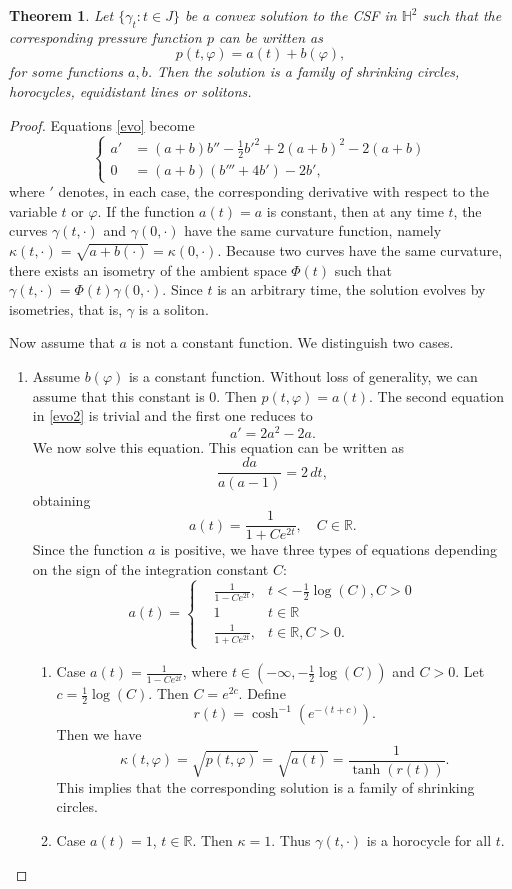 \documentclass[10pt,a4paper]{amsart}
\newtheorem{theorem}{Theorem}
\def\h{\mathbb H}
\def\r{\mathbb R}
\begin{document}
\begin{theorem}\label{t42}
Let $\{\gamma_t\colon t \in J\}$ be a convex solution to the CSF in $\h^2$ such that the corresponding pressure function $p$ can be written as 
$$p(t, \varphi) = a(t) + b(\varphi),$$
for some functions $a,b$. Then the solution   is a  family of shrinking circles, horocycles, equidistant lines or solitons.
\end{theorem}

\begin{proof}
Equations \eqref{evo} become
\begin{equation}\label{evo2}
\left\{
\begin{split}
a' &= (a+b)b'' - \frac{1}{2}b'^2 + 2(a+b)^2 - 2(a+b) \\
0&= (a+b)(b'''+4b')-2b',
\end{split}\right.
\end{equation}
where $'$ denotes, in each case, the corresponding derivative with respect to the variable $t$ or $\varphi$. 
 If the function $a(t)=a$ is constant, then at any time $t$, the curves $\gamma(t, \cdot)$ and $\gamma(0, \cdot)$ have the same curvature function, namely $\kappa(t, \cdot) = \sqrt{a + b(\cdot)} = \kappa(0, \cdot)$. 
Because two curves have the same curvature, there exists an isometry of the ambient space $\Phi(t)$ such that $\gamma(t, \cdot) = \Phi(t)\gamma(0, \cdot)$. Since $t$ is an arbitrary time, the solution evolves by isometries,  that is, $\gamma$ is a soliton.  
 
Now assume that $a$ is not a constant function. We distinguish two cases.
\begin{enumerate}
\item Assume   $b(\varphi) $ is a constant function. Without loss of generality, we can assume that this constant is $0$. Then $p(t, \varphi) = a(t)$.  The second equation in \eqref{evo2} is trivial and the first one   reduces to  
$$a' = 2a^2 - 2a.$$ 
We now solve this equation. This equation can be written as
$$\frac{da}{a(a-1)}=2\, dt,$$
obtaining
$$a(t)=\frac{1}{1+C e^{2t}},\quad C\in\r.$$
Since the function $a$ is positive, we have three types of equations depending on the sign of the integration constant $C$:
\begin{equation}\label{a3}
a(t) = \left\{\begin{array}{lll} 
 &\frac{1}{1-Ce^{2t}},  & t<-\frac12\log(C), C>0\\ 
  & 1 &t\in\r\\
  &\frac{1}{1+Ce^{2t}},&t\in\r,  C>0.
  \end{array}\right.
\end{equation}
\begin{enumerate}
\item Case $a(t) =  \frac{1}{1-Ce^{2t}}$, where $t\in (-\infty,-\frac12\log(C))$ and $C>0$. Let $c=\frac12\log(C)$. Then $C=e^{2c}$. Define
$$r(t)=\cosh^{-1}(e^{-(t+c)}).$$
 Then we have 
$$\kappa(t, \varphi) = \sqrt{p(t, \varphi)} = \sqrt{a(t)} = \frac{1}{\tanh(r(t))}.$$ 
This implies that the  corresponding solution is a  family of shrinking circles.  
 \item Case  $a(t)=1$, $t\in\r$. Then $\kappa=1$. Thus $\gamma(t,\cdot)$ is a horocycle for all $t$. 


\end{enumerate}
\end{enumerate}
\end{proof}
\end{document}
